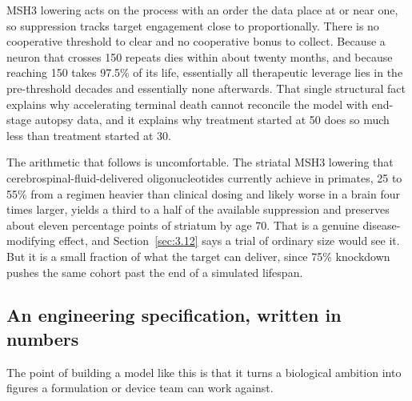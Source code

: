 \documentclass[conference]{IEEEtran}
\begin{document}
MSH3 lowering acts on the process with an order the data place at or near one, so suppression tracks target engagement close to proportionally. There is no cooperative threshold to clear and no cooperative bonus to collect. Because a neuron that crosses 150 repeats dies within about twenty months, and because reaching 150 takes 97.5\% of its life, essentially all therapeutic leverage lies in the pre-threshold decades and essentially none afterwards. That single structural fact explains why accelerating terminal death cannot reconcile the model with end-stage autopsy data, and it explains why treatment started at 50 does so much less than treatment started at 30.

The arithmetic that follows is uncomfortable. The striatal MSH3 lowering that cerebrospinal-fluid-delivered oligonucleotides currently achieve in primates, 25 to 55\% from a regimen heavier than clinical dosing and likely worse in a brain four times larger, yields a third to a half of the available suppression and preserves about eleven percentage points of striatum by age 70. That is a genuine disease-modifying effect, and Section~\ref{sec:3.12} says a trial of ordinary size would see it. But it is a small fraction of what the target can deliver, since 75\% knockdown pushes the same cohort past the end of a simulated lifespan.

\subsection{An engineering specification, written in numbers}
\label{sec:4.2}
The point of building a model like this is that it turns a biological ambition into figures a formulation or device team can work against.
\end{document}
